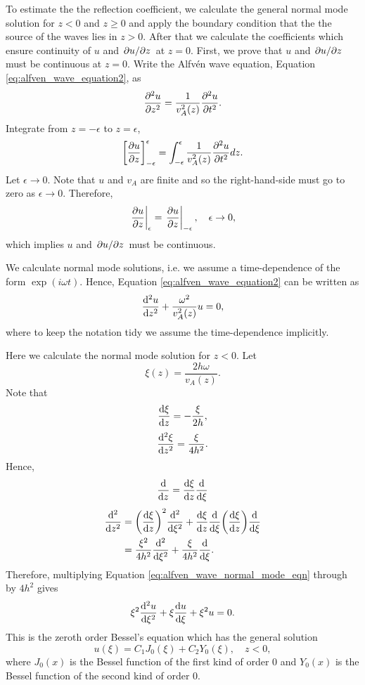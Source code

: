 To estimate the the reflection coefficient, we calculate the general normal mode solution for $z<0$ and $z\ge0$ and apply the boundary condition that the the source of the waves lies in $z>0$. After that we calculate the coefficients which ensure continuity of $u$ and $\pdv*{u}{z}$ at $z=0$. First, we prove that $u$ and $\pdv*{u}{z}$ must be continuous at $z=0$. Write the Alfv\'en wave equation, Equation \eqref{eq:alfven_wave_equation2}, as
\[\pdv[2]{u}{z}=\frac{1}{v_A^2(z)}\pdv[2]{u}{t}.\]
Integrate from $z=-\epsilon$ to $z=\epsilon$,
\[\qty[\pdv{u}{z}]_{-\epsilon}^\epsilon=\int_{-\epsilon}^\epsilon\frac{1}{v_A^2(z)}\pdv[2]{u}{t}dz.\]
Let $\epsilon\rightarrow0$. Note that $u$ and $v_A$ are finite and so the right-hand-side must go to zero as $\epsilon\rightarrow 0$. Therefore,
\[\left.\pdv{u}{z}\right|_{\epsilon}=\left.\pdv{u}{z}\right|_{-\epsilon},\quad \epsilon\rightarrow0,\]
which implies $u$ and $\pdv*{u}{z}$ must be continuous.

We calculate normal mode solutions, i.e. we assume a time-dependence of the form $\exp(i\omega t)$. Hence, Equation \eqref{eq:alfven_wave_equation2} can be written as
\begin{equation}
    \label{eq:alfven_wave_normal_mode_eqn}
    \dv[2]{u}{z}+\frac{\omega^2}{v_A^2(z)}u=0,
\end{equation}
where to keep the notation tidy we assume the time-dependence implicitly.

Here we calculate the normal mode solution for $z<0$. Let 
\begin{equation}
    \xi(z)=\frac{2h\omega}{v_A(z)}.
\end{equation}
Note that
\[\dv{\xi}{z}=-\frac{\xi}{2h},\]
\[\dv[2]{\xi}{z}=\frac{\xi}{4h^2}.\]
Hence,
\[\dv{}{z}=\dv{\xi}{z}\dv{}{\xi}\]
\[\begin{aligned}
\dv[2]{}{z}&=\qty(\dv{\xi}{z})^2\dv[2]{}{\xi}+\dv{\xi}{z}\dv{}{\xi}\qty(\dv{\xi}{z})\dv{}{\xi} \\
&=\frac{\xi^2}{4h^2}\dv[2]{}{\xi}+\frac{\xi}{4h^2}\dv{}{\xi}.
\end{aligned}\]
Therefore, multiplying Equation \eqref{eq:alfven_wave_normal_mode_eqn} through by $4h^2$ gives
\begin{equation}
    \xi^2\dv[2]{u}{\xi}+\xi\dv{u}{\xi}+\xi^2u=0.
\end{equation}
This is the zeroth order Bessel's equation which has the general solution
\begin{equation}
    \label{eq:general_soln_z_lt_0}
    u(\xi)= C_1J_0(\xi) + C_2Y_0(\xi),\quad z<0,
\end{equation}
where $J_0(x)$ is the Bessel function of the first kind of order 0 and $Y_0(x)$ is the Bessel function of the second kind of order 0. 

